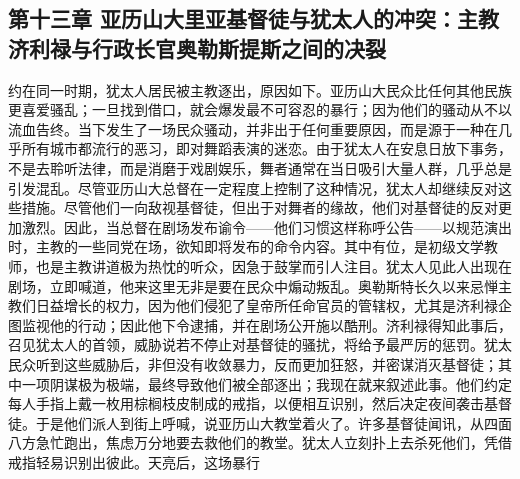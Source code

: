 
\subsection{第十三章 亚历山大里亚基督徒与犹太人的冲突：主教济利禄与行政长官奥勒斯提斯之间的决裂}

约在同一时期，犹太人居民被主教逐出，原因如下。\newline{}亚历山大民众比任何其他民族更喜爱骚乱；一旦找到借口，就会爆发最不可容忍的暴行；因为他们的骚动从不以流血告终。\newline{}当下发生了一场民众骚动，并非出于任何重要原因，而是源于一种在几乎所有城市都流行的恶习，即对舞蹈表演的迷恋。\newline{}由于犹太人在安息日放下事务，不是去聆听法律，而是消磨于戏剧娱乐，舞者通常在当日吸引大量人群，几乎总是引发混乱。\newline{}尽管亚历山大总督在一定程度上控制了这种情况，犹太人却继续反对这些措施。\newline{}尽管他们一向敌视基督徒，但出于对舞者的缘故，他们对基督徒的反对更加激烈。\newline{}因此，当总督在剧场发布谕令——他们习惯这样称呼公告——以规范演出时，主教的一些同党在场，欲知即将发布的命令内容。\newline{}其中有位，是初级文学教师，也是主教讲道极为热忱的听众，因急于鼓掌而引人注目。\newline{}犹太人见此人出现在剧场，立即喊道，他来这里无非是要在民众中煽动叛乱。\newline{}奥勒斯特长久以来忌惮主教们日益增长的权力，因为他们侵犯了皇帝所任命官员的管辖权，尤其是济利禄企图监视他的行动；因此他下令逮捕，并在剧场公开施以酷刑。\newline{}济利禄得知此事后，召见犹太人的首领，威胁说若不停止对基督徒的骚扰，将给予最严厉的惩罚。\newline{}犹太民众听到这些威胁后，非但没有收敛暴力，反而更加狂怒，并密谋消灭基督徒；其中一项阴谋极为极端，最终导致他们被全部逐出；我现在就来叙述此事。\newline{}他们约定每人手指上戴一枚用棕榈枝皮制成的戒指，以便相互识别，然后决定夜间袭击基督徒。\newline{}于是他们派人到街上呼喊，说亚历山大教堂着火了。\newline{}许多基督徒闻讯，从四面八方急忙跑出，焦虑万分地要去救他们的教堂。犹太人立刻扑上去杀死他们，凭借戒指轻易识别出彼此。\newline{}天亮后，这场暴行